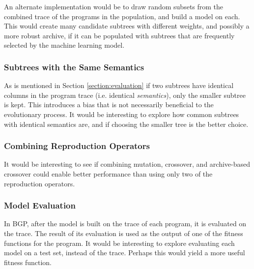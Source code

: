 An alternate implementation would be to draw random subsets from the combined trace of the programs in the population, and build a model on each.  This would create many candidate subtrees with different weights, and possibly a more robust archive, if it can be populated with subtrees that are frequently selected by the machine learning model.

\subsubsection{Subtrees with the Same Semantics}
As is mentioned in Section \ref{section:evaluation} if two subtrees have identical columns in the program trace (i.e. identical \textit{semantics}), only the smaller subtree is kept.  This introduces a bias that is not necessarily beneficial to the evolutionary process.  It would be interesting to explore how common subtrees with identical semantics are, and if choosing the smaller tree is the better choice.

\subsubsection{Combining Reproduction Operators}
It would be interesting to see if combining mutation, crossover, and archive-based crossover could enable better performance than using only two of the reproduction operators.


\subsubsection{Model Evaluation}
In BGP, after the model is built on the trace of each program, it is evaluated on the trace.  The result of its evaluation is used as the output of one of the fitness functions for the program.  It would be interesting to explore evaluating each model on a test set, instead of the trace.  Perhaps this would yield a more useful fitness function.
